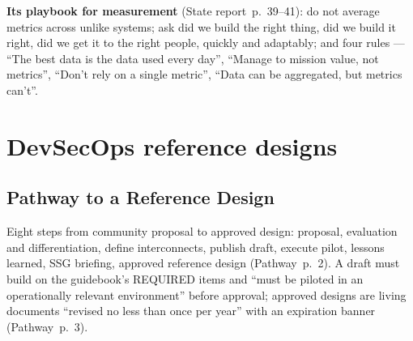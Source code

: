 \documentclass[11pt,letterpaper,twoside,openany]{memoir}
\newcommand{\pg}[2]{{\small(#1~p.~#2)}}          %
\begin{document}
\textbf{Its playbook for measurement} \pg{State report}{39--41}: do not average metrics across unlike systems; ask did we
build the right thing, did we build it right, did we get it to the right people, quickly and adaptably; and four rules ---
``The best data is the data used every day'', ``Manage to mission value, not metrics'', ``Don't rely on a single
metric'', ``Data can be aggregated, but metrics can't''.

\chapter{DevSecOps reference designs}\label{ch:rd}

\section{Pathway to a Reference Design}
Eight steps from community proposal to approved design: proposal, evaluation and differentiation, define interconnects,
publish draft, execute pilot, lessons learned, SSG briefing, approved reference design \pg{Pathway}{2}. A draft must
build on the guidebook's REQUIRED items and ``must be piloted in an operationally relevant environment'' before approval;
approved designs are living documents ``revised no less than once per year'' with an expiration banner
\pg{Pathway}{3}.
\end{document}
